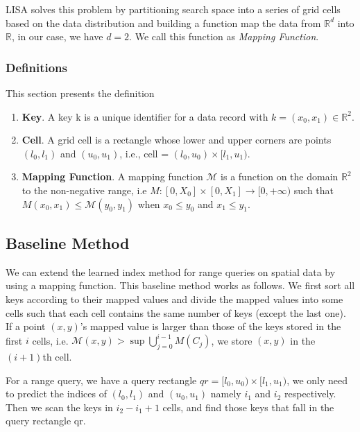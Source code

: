 LISA solves this problem by partitioning search space into a series of grid cells based on the data distribution and building a function map the data from $\mathbb{R}^d$ into $\mathbb{R}$, in our case, we have $d=2$. We call this function as \textit{Mapping Function}.
\subsubsection{Definitions}

This section presents the definition

\begin{enumerate}
	\item \textbf{Key}. A key k is a unique identifier for a data record with $k = (x_{0}, x_{1}) \in \mathbb{R}^{2}$. 
    
	\item \textbf{Cell}. A grid cell is a rectangle whose lower and upper corners are points $(l_0, l_1)$ and  $(u_0,u_1)$, i.e.,  cell = $(l_{0},u_{0}) \times [l_{1},u_{1})$.
	
	\item \textbf{Mapping Function}. A mapping function $\mathcal{M}$ is a function on the domain $\mathbb{R}^2$ to the non-negative range, i.e $M:[0,X_{0}]\times [0,X_{1}]\to [0,+\infty)$ such that $M(x_0,x_{1}) \leq \mathcal{M}(y_{0},y_1)$ when $x_0 \leq y_0$ and $x_1 \leq y_1$.
\end{enumerate}

\subsection{Baseline Method}  

We can extend the learned index method for range queries on spatial data by using a mapping function. This baseline method works as follows. We first sort all keys according to their mapped values and divide the mapped values into some cells such that each cell contains the same number of keys (except the last one). If a point $(x,y)$’s mapped value is larger than those of the keys stored in the first $i$ cells, i.e. $\mathcal{M}(x,y) > \sup \bigcup\limits_{j=0}^{i-1} M(C_{j})$, we store $(x,y)$ in the $(i+1)$th cell. 

For a range query, we have a query rectangle $qr = [l_{0},u_{0}) \times [l_{1},u_{1})$, we only need to predict the indices of $(l_{0}, l_{1})$ and $(u_{0},u_{1})$ namely $i_{1}$ and $i_{2}$ respectively. Then we scan the keys in $i_{2}-i_{1}+1$ cells, and find those keys that fall in the query rectangle qr. 

